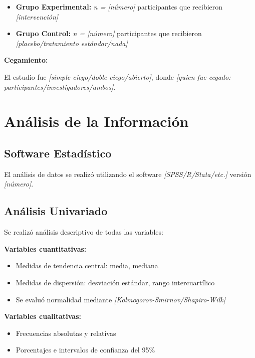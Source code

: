 \begin{itemize}
    \item \textbf{Grupo Experimental:} \textit{n = [número]} participantes que recibieron \textit{[intervención]}
    \item \textbf{Grupo Control:} \textit{n = [número]} participantes que recibieron \textit{[placebo/tratamiento estándar/nada]}
\end{itemize}

\textbf{Cegamiento:}

El estudio fue \textit{[simple ciego/doble ciego/abierto]}, donde \textit{[quien fue cegado: participantes/investigadores/ambos]}.

\section{Análisis de la Información}
\label{sec:analisis_informacion}

\subsection{Software Estadístico}
\label{subsec:software}

El análisis de datos se realizó utilizando el software \textit{[SPSS/R/Stata/etc.]} versión \textit{[número]}.

\subsection{Análisis Univariado}
\label{subsec:analisis_univariado}

Se realizó análisis descriptivo de todas las variables:

\textbf{Variables cuantitativas:}
\begin{itemize}
    \item Medidas de tendencia central: media, mediana
    \item Medidas de dispersión: desviación estándar, rango intercuartílico
    \item Se evaluó normalidad mediante \textit{[Kolmogorov-Smirnov/Shapiro-Wilk]}
\end{itemize}

\textbf{Variables cualitativas:}
\begin{itemize}
    \item Frecuencias absolutas y relativas
    \item Porcentajes e intervalos de confianza del 95\%
\end{itemize}

